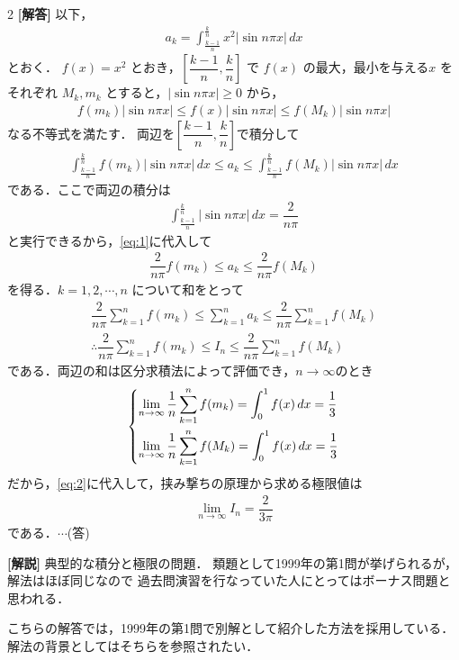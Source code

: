 \documentclass[../../main.tex]{subfiles}
\begin{document}
\setcounter{equation}{0}
\setcounter{figure}{0}
\setcounter{table}{0}
\begin{oframed}
  
\end{oframed}

\setlength{\columnseprule}{0.4pt}
\begin{multicols}{2}
  {\bf [解答]}
  以下，
  \begin{align}
    a_k = \int_{\frac{k-1}{n}}^{\frac{k}{n}} x^2 \left|\sin n\pi x\right| \,dx
  \end{align}
  とおく．
  $f(x)=x^2$ とおき，$\left[ \dfrac{k-1}{n}, \dfrac{k}{n} \right]$ で $f(x)$ の最大，最小を与える$x$ をそれぞれ $M_k, m_k$ とすると，$|\sin n\pi x| \ge 0$ から，
  \begin{align}
    f(m_k) |\sin n\pi x| \le f(x) |\sin n\pi x| \le f(M_k) |\sin n\pi x|
  \end{align}
  なる不等式を満たす．
  両辺を$\left[ \dfrac{k-1}{n}, \dfrac{k}{n} \right]$で積分して
  \begin{align}
    \int_{\frac{k-1}{n}}^{\frac{k}{n}} f(m_k) |\sin n\pi x| \,dx \le a_k \le \int_{\frac{k-1}{n}}^{\frac{k}{n}} f(M_k) |\sin n\pi x| \,dx \label{eq:1}
  \end{align}
  である．ここで両辺の積分は
  \begin{align}
    \int_{\frac{k-1}{n}}^{\frac{k}{n}} |\sin n\pi x| \,dx = \dfrac{2}{n\pi}
  \end{align}
  と実行できるから，\cref{eq:1}に代入して
  \begin{align}
    \dfrac{2}{n\pi} f(m_k) \le a_k \le \dfrac{2}{n\pi} f(M_k)
  \end{align}
  を得る．$k=1,2,\cdots,n$ について和をとって
  \begin{align}
    \dfrac{2}{n\pi} \sum_{k=1}^{n} f(m_k) \le \sum_{k=1}^{n} a_k \le \dfrac{2}{n\pi} \sum_{k=1}^{n} f(M_k) \nonumber \\
    \therefore
    \dfrac{2}{n\pi} \sum_{k=1}^{n} f(m_k) \le I_n \le \dfrac{2}{n\pi} \sum_{k=1}^{n} f(M_k) \label{eq:2}
  \end{align}
  である．両辺の和は区分求積法によって評価でき，$n\to\infty$のとき
  \begin{align}
    \begin{dcases}
      \lim_{n\to\infty}\dfrac{1}{n} \sum_{k=1}^{n} f(m_k) = \int_{0}^{1} f(x) \,dx = \dfrac{1}{3} \\
      \lim_{n\to\infty}\dfrac{1}{n} \sum_{k=1}^{n} f(M_k) = \int_{0}^{1} f(x) \,dx = \dfrac{1}{3}
    \end{dcases}
  \end{align}
  だから，\cref{eq:2}に代入して，挟み撃ちの原理から求める極限値は
  \begin{align}
    \lim_{n\to\infty}I_n = \dfrac{2}{3\pi}
  \end{align}
  である．$\cdots$(答)

  {\bf [解説]}
  典型的な積分と極限の問題．
  類題として1999年の第1問が挙げられるが，解法はほぼ同じなので
  過去問演習を行なっていた人にとってはボーナス問題と思われる．

  こちらの解答では，1999年の第1問で別解として紹介した方法を採用している．
  解法の背景としてはそちらを参照されたい．

  \newpage
\end{multicols}
\end{document}
